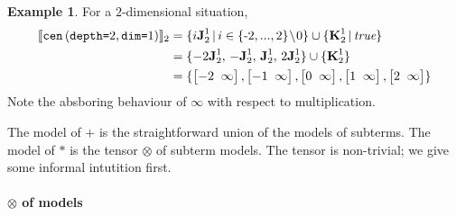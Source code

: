 \documentclass[9pt]{sigplanconf}
\newcounter{block}
\theoremstyle{definition}
\newtheorem{example}[block]{Example}
\newcommand{\interp}[1]{\llbracket{#1}\rrbracket}
\newcommand{\term}[1]{\texttt{#1}}
\newcommand{\stenCenS}[2]{\term{cen} \, (\term{depth=}#1,
  \term{dim=}#2)}
\newcommand{\vtwoh}[2]{\setlength{\arraycolsep}{0em}
\left[\begin{array}{cc}#1 \; & \; #2\end{array}\right]}
\newcommand{\singleEntry}[2]{\textbf{J}_{#2}^{#1}}
\newcommand{\zeroEntry}[2]{\textbf{K}_{#2}^{#1}}
\begin{document}
\begin{example}
For a $2$-dimensional situation, 
\begin{align*}
\interp{\stenCenS{2}{1}}_2 = \; & \{i\singleEntry{1}{2} \,|\, i \in \{\text{-}2,..., 2\}\!\setminus\!0 \}
  \cup  \{ \zeroEntry{1}{2} \,|\, \textit{true} \} \\
= \; & \{-2\singleEntry{1}{2}, \, -\singleEntry{1}{2}, \,
  \singleEntry{1}{2}, \, 2\singleEntry{1}{2}\} \cup
  \{\zeroEntry{1}{2}\} \\
= \; & \{\vtwoh{-2}{\infty}, \vtwoh{-1}{\infty}, \vtwoh{0}{\infty}, 
\vtwoh{1}{\infty}, \vtwoh{2}{\infty}\} 
\end{align*}
Note the absboring behaviour of $\infty$ with respect to
multiplication. 
\end{example}
\noindent
The model of $\term{+}$ is the straightforward union of 
the models of subterms. The model of $\term{*}$ is
the tensor $\otimes$ of subterm models. The tensor 
is non-trivial; we give some informal intutition first.

\paragraph{$\otimes$ of models}
\end{document}
